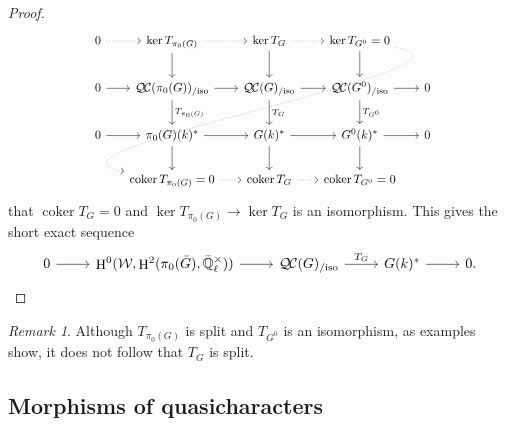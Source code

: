\documentclass[CM,Submssn,SecEq]{degruyter-crelle} %
\theoremstyle{plain}
\theoremstyle{definition}
\theoremstyle{remark}
\newtheorem{remark}[theorem]{Remark}
\newcommand{\EE}{\mathbb{\bar Q}_\ell}
\newcommand{\Fq}{k}
\newcommand{\EEx}{\EE^\times}
\newcommand{\Weil}[1]{\mathcal{W}_{#1}}
\DeclareMathOperator{\coker}{coker}
\DeclareMathOperator{\Hh}{H}
\newcommand{\TrFrob}[1]{T_{#1}}
\newcommand{\QC}{{\mathcal{Q\hskip-0.8pt C}}}
\newcommand{\QCiso}[1]{\QC(#1)_{/\text{iso}}}
\newcommand{\bG}{\bar{G}}
\begin{document}
\begin{proof}
 \[
  \begin{tikzcd}[row sep=20, column sep=15]
    0 \arrow[dotted]{r} & \ker \TrFrob{\pi_0(G)} \arrow[dotted]{r} \dar & \arrow{d} \ker \TrFrob{G} \arrow[dotted]{r} & \ker \TrFrob{G^0} =0 \arrow[dotted, out=-10, in=170]{dddll} \dar & \\
    0 \rar & \QCiso{\pi_0(G)} \rar \dar{\TrFrob{\pi_0(G)}}
    & \QCiso{G} \rar \dar{\TrFrob{G}} & \QCiso{G^0} \rar \dar{\TrFrob{G^0}} & 0\\
    0 \rar & \pi_0(G)(\Fq)^* \rar \dar
    & \arrow{d} G(\Fq)^* \rar & G^0(\Fq)^* \rar \dar & 0\\
   &  \coker \TrFrob{\pi_0(G)} =0 \arrow[dotted]{r} & \coker \TrFrob{G} \arrow[dotted]{r} & \coker \TrFrob{G^0} =0 & 
  \end{tikzcd}
  \]
that $\coker \TrFrob{G} =0$
and $\ker \TrFrob{\pi_0(G)} \to \ker \TrFrob{G}$ is an isomorphism.
This gives the short exact sequence
\[
  \begin{tikzcd}
0 \arrow{r} & \Hh^0(\Weil{},\Hh^2(\pi_0(\bG),\EEx)) \arrow{r} & \QCiso{G} \arrow{r}{\TrFrob{G}} & G(\Fq)^* \arrow{r} & 0. 
  \end{tikzcd}
\]
\end{proof}

\begin{remark}
Although $\TrFrob{\pi_0(G)}$ is split and $\TrFrob{G^0}$ is an isomorphism, as examples show, it does not follow that $\TrFrob{G}$ is split. 
\end{remark}

\subsection{Morphisms of quasicharacters} \label{ssec:qcmor}
\end{document}
